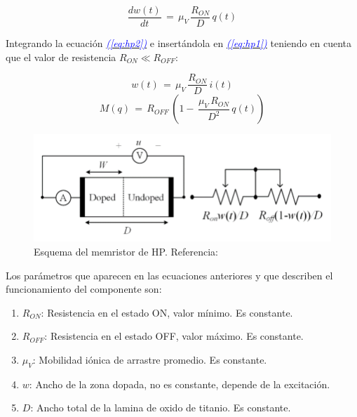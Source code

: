\documentclass[12pt,a4paper]{report} %
\newcommand{\eref}[1]{\hyperref[#1]{\textcolor{blue}{\textit{(\ref*{#1})}}}}
\begin{document}
	\begin{equation}
		\frac{dw(t)}{dt}\,=\,\mu_V\,\frac{R_{ON}}{D}\,q(t)
		\label{eq:hp2}
	\end{equation}\smallskip
	
	Integrando la ecuación \eref{eq:hp2} e insertándola en \eref{eq:hp1} teniendo en cuenta que el valor de resistencia  $R_{ON} \ll R_{OFF}$: 
	
	\begin{equation}
		w(t)\,=\,\mu_V\,\frac{R_{ON}}{D}\,i(t)
		\label{eq:hp3}
	\end{equation}\smallskip
	\begin{equation}
		M(q)\,=\,R_{OFF}\,\left(1-\,\frac{\mu_V\,R_{ON}}{D^2}\,q(t)\right)
		\label{eq:hp4}
	\end{equation}\smallskip
	
	\begin{figure}[h]
		\centering
		\includegraphics[width=1\textwidth]{schmem.png}
		\caption{Esquema del memristor de HP. Referencia: \cite{2021}}
		\label{fig:2021}
	\end{figure}\smallskip
	
	Los parámetros que aparecen en las ecuaciones anteriores y que describen el funcionamiento del componente son:
	
	\begin{enumerate}
		\item $R_{ON}$: Resistencia en el estado ON, valor mínimo. Es constante.
		\item $R_{OFF}$: Resistencia en el estado OFF, valor máximo. Es constante.
		\item $\mu_V$: Mobilidad iónica de arrastre promedio. Es constante.
		\item $w$: Ancho de la zona dopada, no es constante, depende de la excitación.
		\item $D$: Ancho total de la lamina de oxido de titanio. Es constante.
	\end{enumerate}
	\newpage
	
\end{document}
